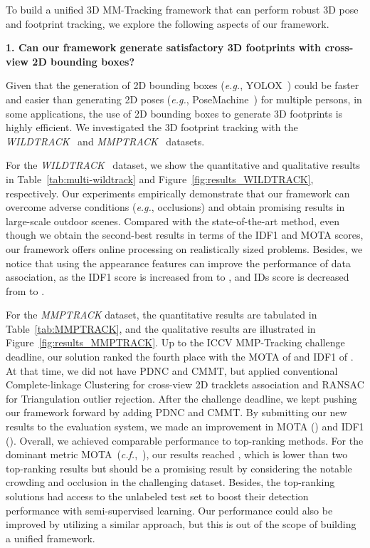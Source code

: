 \documentclass{CVM}
\newcommand{\eg}{{\it e.g.}}
\begin{document}
To build a unified 3D MM-Tracking framework that can perform robust 3D pose and footprint tracking, we explore the following aspects of our framework.





\textbf{1. Can our framework generate satisfactory 3D footprints with cross-view 2D bounding boxes?} 

Given that the generation of 2D bounding boxes (\eg, YOLOX~\cite{yolox2021}) could be faster and easier than generating 2D poses (\eg, PoseMachine~\cite{cao2017realtime}) for multiple persons, in some applications, the use of 2D bounding boxes to generate 3D footprints is highly efficient. We investigated the 3D footprint tracking with the \textit{WILDTRACK}~\cite{chavdarova2018wildtrack} and \textit{MMPTRACK}~\cite{han2021mmptrack} datasets.


For the \textit{WILDTRACK}~\cite{chavdarova2018wildtrack} dataset, we show the quantitative and qualitative results in Table~\ref{tab:multi-wildtrack} and Figure~\ref{fig:results_WILDTRACK}, respectively. Our experiments empirically demonstrate that our framework can overcome adverse conditions (\eg, occlusions) and obtain promising results in large-scale outdoor scenes. Compared with the state-of-the-art method, even though we obtain the second-best results in terms of the IDF1 and MOTA scores, our framework offers online processing on realistically sized problems. Besides, we notice that using the appearance features can improve the performance of data association, as the IDF1 score is increased from  to , and IDs score is decreased from  to . 


For the \textit{MMPTRACK} dataset, the quantitative results are tabulated in Table~\ref{tab:MMPTRACK}, and the qualitative results are illustrated in Figure~\ref{fig:results_MMPTRACK}.
Up to the ICCV MMP-Tracking challenge deadline, our solution ranked the 
fourth place with the MOTA of  and IDF1 of . At that time, we did not have PDNC and CMMT, but applied conventional Complete-linkage Clustering for cross-view 2D tracklets association and RANSAC for Triangulation outlier rejection. After the challenge deadline, we kept pushing our framework forward by adding PDNC and CMMT. By submitting our new results to the evaluation system, we made an improvement in MOTA () and IDF1 (). Overall, we achieved comparable performance to top-ranking methods. For the dominant metric MOTA~(\textit{c.f.},~\cite{MOTChallenge2015,milan2016mot16}), our results reached , which is  lower than two top-ranking results but should be a promising result by considering the notable crowding and occlusion in the challenging dataset. Besides, the top-ranking solutions had access to the unlabeled test set to boost their detection performance with semi-supervised learning. Our performance could also be improved by utilizing a similar approach, but this is out of the scope of building a unified framework. 
\end{document}
